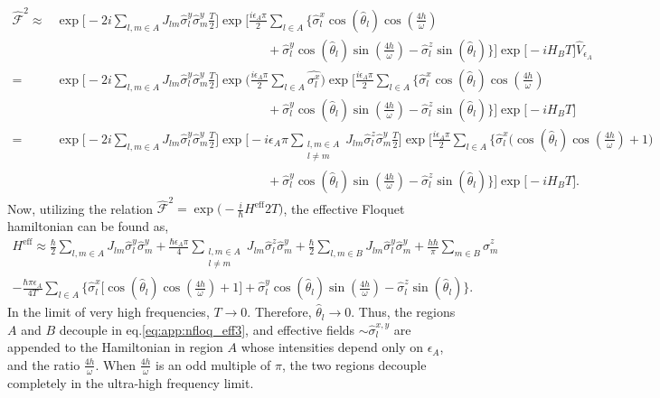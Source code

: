 \documentclass[%
nofootinbib,
reprint,
superscriptaddress,
amsmath,amssymb,showkeys,
aps,
prb,
]{revtex4-2}
\begin{document}
	\begin{align}		
		\hat{\mathcal{F}}^2 	\approx& \exp\Bigg[-2i  \sum_{l,m\in A}J_{lm} \hat{\sigma}^y_l\hat{\sigma}^y_m\frac{T}{2}\Bigg]\exp\Bigg[\frac{i \epsilon_A \pi}{2}\sum_{l\in A}\Big\{\hat{\sigma}^x_l \cos(\hat{\theta}_l)\cos(\frac{4h}{\omega})\nonumber\\
		&\hspace{7cm}+ \hat{\sigma}^y_l \cos(\hat{\theta}_l)\sin(\frac{4h}{\omega})-\hat{\sigma}^z_l \sin(\hat{\theta}_l)\Big\}\Bigg] \exp\big[-i H_B T\big]\hat{V}_{\epsilon_A}\nonumber\\
		=&\exp\Bigg[-2i \sum_{l,m\in A}J_{lm} \hat{\sigma}_l^y\hat{\sigma}_m^y\frac{T}{2}\Bigg] \exp\Big(\frac{i\epsilon_A \pi}{2}\sum_{l\in A}\hat{\sigma^x_l}\Big) \exp\Bigg[\frac{i \epsilon_A \pi}{2}\sum_{l\in A}\Big\{\hat{\sigma}^x_l \cos(\hat{\theta}_l)\cos(\frac{4h}{\omega})\nonumber\\
		&\hspace{ 7cm}  +\hat{\sigma}^y_l \cos(\hat{\theta}_l)\sin(\frac{4h}{\omega})-\hat{\sigma}^z_l \sin(\hat{\theta}_l)\Big\}\Bigg]\exp\big[-i H_B T\big]\nonumber\\
		=&\exp\Bigg[-2i\sum_{l,m\in A}J_{lm}\hat{\sigma}^y_l\hat{\sigma}^y_m \frac{T}{2}\Bigg] \exp\Bigg[-i\epsilon_A \pi \sum_{\substack{l,m \in A\\l\neq m}}J_{lm} \hat{\sigma}^z_l\hat{\sigma}^y_m\frac{T}{2}\Bigg] \exp\Bigg[\frac{i \epsilon_A \pi}{2}\sum_{l\in A}\Bigg\{\hat{\sigma}^x_l\Bigg( \cos(\hat{\theta}_l)\cos(\frac{4h}{\omega})+1\Bigg)\nonumber\\
		&\hspace{7cm} +\hat{\sigma}^y_l \cos(\hat{\theta}_l)\sin(\frac{4h}{\omega})-\hat{\sigma}^z_l \sin(\hat{\theta}_l)\Bigg\}\Bigg] \exp\big[-i H_B T\big].
		\label{eq:floq_couple1}
	\end{align}
	Now, utilizing the relation $\displaystyle \hat{\mathcal{F}}^2 = \exp\Big(-\frac{i}{\hbar}H^{\mathrm{eff}}2T\Big)$, the effective Floquet hamiltonian can be found as,
	\begin{multline}
		H^{\mathrm{eff}} \approx\frac{\hbar}{2} \sum_{l,m\in A}J_{lm}\hat{\sigma}_l^y\hat{\sigma}_m^y +\frac{\hbar \epsilon_A \pi}{4} \sum_{\substack{l,m\in A\\l\neq m}} J_{lm}\hat{\sigma}^z_l\hat{\sigma}^y_m + \frac{\hbar}{2}\sum_{l,m\in B}J_{lm}\hat{\sigma}_l^y \hat{\sigma}_m^y + \frac{h\hbar}{\pi}\sum_{m \in B}\hat{\sigma}^z_m \\ -\frac{\hbar \pi \epsilon_A}{4T}\sum_{l\in A}\Bigg\{\hat{\sigma}^x_l \bigg[\cos(\hat{\theta}_l)\cos(\frac{4h}{\omega})+1 \bigg] + \hat{\sigma}^y_l \cos(\hat{\theta}_l)\sin(\frac{4h}{\omega})-\hat{\sigma}^z_l \sin(\hat{\theta}_l)\Bigg\}.
		\label{eq:app:nfloq_eff3}
	\end{multline}
	In the limit of very high frequencies, $T\rightarrow 0$. Therefore,  $\hat{\theta}_l \rightarrow 0$. Thus, the regions $A$ and $B$ decouple in eq.\eqref{eq:app:nfloq_eff3}, and effective fields $\sim \hat{\sigma}^{x,y}_l$ are appended to the Hamiltonian in region $A$ whose intensities depend only on $\epsilon_A$, and the ratio $\frac{4h}{\omega}$. When $\frac{4h}{\omega}$ is an odd multiple of $\pi$, the two regions decouple completely in the ultra-high frequency limit.
	
	
	
\end{document}

